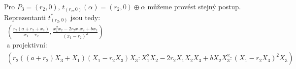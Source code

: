 \documentclass[12pt, a4paper]{article}
\begin{document}
Pro $P_3 = (r_2,0)$, $t_{(r_2,0)}(\alpha) = (r_2, 0) \oplus \alpha$ můžeme provést stejný postup. Reprezentanti $t_{(r_2,0)}^*$ jsou tedy:
\begin{gather*}
\left(\frac{r_2(a+r_2+x_1)}{x_1-r_2}, \frac{x_1^2x_2-2r_2x_1x_2 + bx_2}{(x_1-r_2)^2} \right )\\
\text{a projektivní:}\\
\left(r_2((a+r_2)X_3 + X_1)(X_1-r_2X_3)X_3 : X_1^2X_2-2r_2X_1X_2X_3+bX_2X_3^2 : (X_1-r_2X_3)^2X_3 \right)
\end{gather*}
\end{document}
